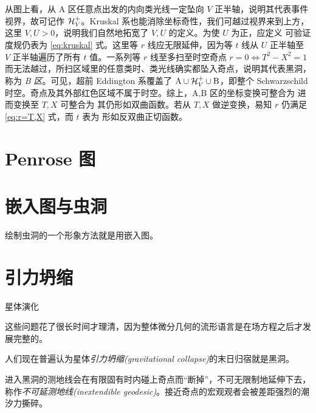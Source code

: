 从图上看，从 A 区任意点出发的内向类光线一定坠向 $V$ 正半轴，说明其代表事件视界，故可记作 $\mathcal{H}_V^+$。Kruskal 系也能消除坐标奇性，我们可越过视界来到上方，这里 $V,U>0$，说明我们自然地拓宽了 $V,U$ 的定义。为使 $U$ 为正，应定义
可验证度规仍表为 \eqref{eq:kruskal} 式。这里等 $r$ 线应无限延伸，因为等 $t$ 线从 $U$ 正半轴至 $V$ 正半轴遍历了所有 $t$ 值。一系列等 $r$ 线至多扫至时空奇点 $r=0\Leftrightarrow T^2-X^2=1$ 而无法越过，所扫区域里的任意类时、类光线确实都坠入奇点，说明其代表黑洞，称为 \textit{B 区}。可见，超前 Eddington 系覆盖了 $\mathrm{A}\cup\mathcal{H}_V^+\cup\mathrm{B}$，即整个 Schwarzschild 时空。奇点及其外部红色区域不属于时空。综上，A,B 区的坐标变换可整合为
进而变换至 $T,X$ 可整合为
其仍形如双曲函数。若从 $T,X$ 做逆变换，易知 $r$ 仍满足 \eqref{eq:r=T,X} 式，而 $t$ 表为
形如反双曲正切函数。




\section{Penrose 图}

\section{嵌入图与虫洞}
绘制虫洞的一个形象方法就是用嵌入图。


\section{引力坍缩}\label{sec:collapse}

星体演化

这些问题花了很长时间才理清，因为整体微分几何的流形语言是在场方程之后才发展完整的。

人们现在普遍认为星体\textit{引力坍缩(gravitational collapse)}的末日归宿就是黑洞。

进入黑洞的测地线会在有限固有时内碰上奇点而“断掉”，不可无限制地延伸下去，称作\textit{不可延测地线(inextendible geodesic)}。接近奇点的宏观观者会被差距强烈的潮汐力撕碎。

